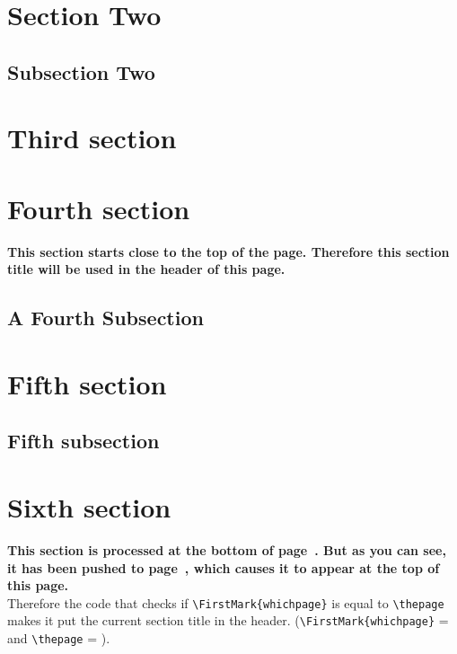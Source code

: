 \documentclass{article}
\newcounter{thispage}
\begin{document}
 \lipsum[1-2]

\section{Section Two}

 \lipsum[3]

\subsection{Subsection Two}
\label{sec:inherited}

 \lipsum[4-7]

\section{Third section}

\lipsum[1-2]

\section{Fourth section}
\label{sec:missing}

{\bfseries This section starts close to the top of the page. Therefore this section title will be used in the header of this page.}

\medskip

\lipsum[3-4]

\subsection{A Fourth Subsection}

\lipsum[7-9]

\section{Fifth section}

\lipsum[1-5]

\subsection{Fifth subsection}

\lipsum[8-10]

\section{Sixth section}
\label{sec:push}

{\bfseries This section is processed at the bottom of page~\thethispage. But as you can see, it has been pushed to page~\pageref{sec:push}, which causes it to appear at the top of this page.}\\
Therefore the code that checks if \verb|\FirstMark{whichpage}| is equal to \verb|\thepage| makes it put the current section title in the header.
(\verb|\FirstMark{whichpage}| = \thethispage{} and  \verb|\thepage| = \pageref{sec:push}).
\end{document}
